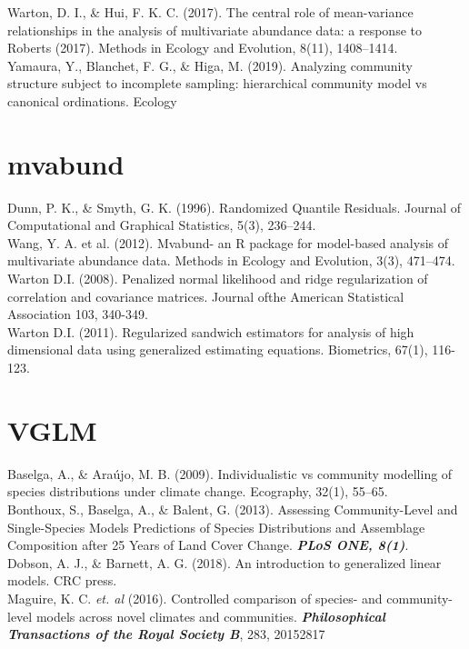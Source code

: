 \documentclass{article}
\begin{document}
Warton, D. I., \& Hui, F. K. C. (2017). The central role of mean-variance relationships in the analysis of multivariate abundance data: a response to Roberts (2017). Methods in Ecology and Evolution, 8(11), 1408–1414. \\

Yamaura, Y., Blanchet, F. G., \& Higa, M. (2019). Analyzing community structure subject to incomplete sampling: hierarchical community model vs canonical ordinations. Ecology\\
\section{mvabund}
Dunn, P. K., \& Smyth, G. K. (1996). Randomized Quantile Residuals. Journal of Computational and Graphical Statistics, 5(3), 236–244. \\

Wang, Y. A. et al. (2012). Mvabund- an R package for model-based analysis of multivariate abundance data. Methods in Ecology and Evolution, 3(3), 471–474. \\

Warton D.I. (2008). Penalized normal likelihood and ridge regularization of correlation and covariance matrices. Journal ofthe American Statistical Association 103, 340-349.\\ 

Warton D.I. (2011). Regularized sandwich estimators for analysis of high dimensional data using generalized estimating equations. Biometrics, 67(1), 116-123.\\
\section{VGLM}
Baselga, A., \& Araújo, M. B. (2009). Individualistic vs community modelling of species distributions under climate change. Ecography, 32(1), 55–65. \\

Bonthoux, S., Baselga, A., \& Balent, G. (2013). Assessing Community-Level and Single-Species Models Predictions of Species Distributions and Assemblage Composition after 25 Years of Land Cover Change. \textbf{\textit{PLoS ONE, 8(1)}}. \\

Dobson, A. J., \& Barnett, A. G. (2018). An introduction to generalized linear models. CRC press.\\

Maguire, K. C. \textit{et. al} (2016). Controlled comparison of species- and community-level models across novel climates and communities. \textbf{\textit{Philosophical Transactions of the Royal Society B}}, 283, 20152817\\
\end{document}
